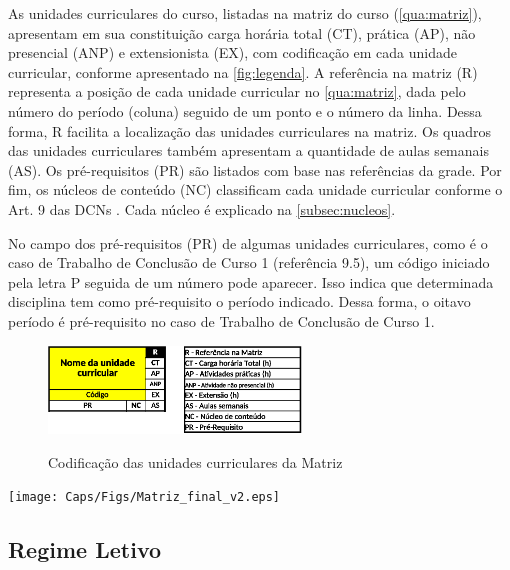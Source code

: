 As unidades curriculares do curso, listadas na matriz do curso (\autoref{qua:matriz}), apresentam em sua constituição carga horária total (CT), prática (AP), não presencial (ANP) e extensionista (EX), com codificação em cada unidade curricular, conforme apresentado na \autoref{fig:legenda}. A referência na matriz (R) representa a posição de cada unidade curricular no \autoref{qua:matriz}, dada pelo número do período (coluna) seguido de um ponto e o número da linha. Dessa forma, R facilita a localização das unidades curriculares na matriz. Os quadros das unidades curriculares também apresentam a quantidade de aulas semanais (AS). Os pré-requisitos (PR) são listados com base nas referências da grade. Por fim, os núcleos de conteúdo (NC) classificam cada unidade curricular conforme o Art. 9\textordmasculine{} das DCNs \cite{dcneng}. Cada núcleo é explicado na \autoref{subsec:nucleos}.

No campo dos pré-requisitos (PR) de algumas unidades curriculares, como é o caso de Trabalho de Conclusão de Curso 1 (referência 9.5), um código iniciado pela letra P seguida de um número pode aparecer. Isso indica que determinada disciplina tem como pré-requisito o período indicado. Dessa forma, o oitavo período é pré-requisito no caso de Trabalho de Conclusão de Curso 1.

\begin{figure}[hbt!]
	\centering
	\caption{Codificação das unidades curriculares da Matriz}
	\includegraphics[width=0.6\textwidth]{Caps/Figs/Matriz_final_v2_leg2.eps}
	\fonte{\utf}
	\label{fig:legenda}
\end{figure}

\begin{landscape}
	\begin{quadro}
		\centering
		\caption{Matriz do Curso de Engenharia Eletrônica}
		\texttt{[image: Caps/Figs/Matriz\_final\_v2.eps]}
		\fonte{\utf}
		\label{qua:matriz}
	\end{quadro}
\end{landscape}
\restoregeometry



\subsection{Regime Letivo}
\label{sub:reg}

